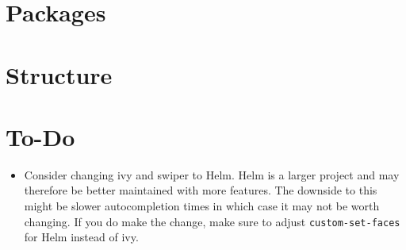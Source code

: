 \documentclass{default}
\begin{document}
\tableofcontents
\hypersetup{linkcolor=red}

\chapter{Packages}\label{cha:packages}


\chapter{Structure}\label{cha:structure}


\chapter{To-Do}\label{cha:to-do}

\begin{itemize}
\item Consider changing ivy and swiper to Helm. Helm is a larger project and may therefore be better
  maintained with more features. The downside to this might be slower autocompletion times in which
  case it may not be worth changing. If you do make the change, make sure to adjust
  \lstinline{custom-set-faces} for Helm instead of ivy.
\end{itemize}
\end{document}

